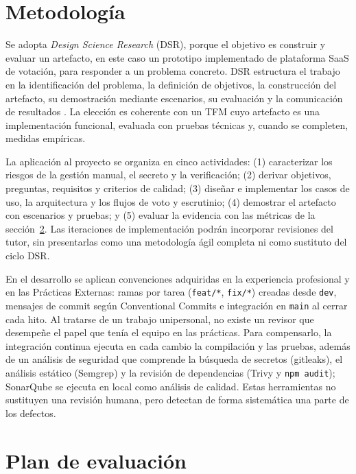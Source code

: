\section{Metodología}
\label{sec:metodologia}

Se adopta \emph{Design Science Research} (DSR), porque el objetivo es construir
y evaluar un artefacto, en este caso un prototipo implementado de plataforma
SaaS de votación, para responder a un problema concreto. DSR estructura el trabajo
en la identificación del problema, la definición de objetivos, la construcción del
artefacto, su demostración mediante escenarios, su evaluación y la
comunicación de resultados \citep{hevner2004,peffers2007}. La elección es
coherente con un TFM cuyo artefacto es una implementación funcional, evaluada
con pruebas técnicas y, cuando se completen, medidas empíricas.

La aplicación al proyecto se organiza en cinco actividades: (1) caracterizar
los riesgos de la gestión manual, el secreto y la verificación; (2) derivar
objetivos, preguntas, requisitos y criterios de calidad; (3) diseñar e
implementar los casos de uso, la arquitectura y los flujos de voto y escrutinio;
(4) demostrar el artefacto con escenarios y pruebas; y (5) evaluar
la evidencia con las métricas de la sección~\ref{sec:plan-evaluacion}. Las
iteraciones de implementación podrán incorporar revisiones del tutor, sin
presentarlas como una metodología ágil completa ni como sustituto del ciclo DSR.

En el desarrollo se aplican convenciones adquiridas en la experiencia
profesional y en las Prácticas Externas: ramas por tarea (\texttt{feat/*},
\texttt{fix/*}) creadas desde \texttt{dev}, mensajes de commit según
Conventional Commits e integración en \texttt{main} al cerrar cada hito. Al
tratarse de un trabajo unipersonal, no existe un revisor que desempeñe el
papel que tenía el equipo en las prácticas. Para compensarlo, la integración
continua ejecuta en cada cambio la compilación y las pruebas, además de un
análisis de seguridad que comprende la búsqueda de secretos (gitleaks), el
análisis estático (Semgrep) y la revisión de dependencias (Trivy y
\texttt{npm audit}); SonarQube se ejecuta en local como análisis de calidad.
Estas herramientas no sustituyen una revisión humana, pero detectan de forma
sistemática una parte de los defectos.

\section{Plan de evaluación}
\label{sec:plan-evaluacion}

